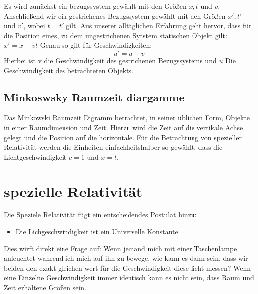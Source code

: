 \documentclass[12pt]{article}
\begin{document}
Es wird zunächst ein bezugssystem gewählt mit den Größen $x, t$ und $v$.
Anschließend wir ein gestrichenes Bezugssystem gewählt mit den Größen $x', t'$ und $v'$, wobei $t = t'$ gilt.
Aus unserer alltäglichen Erfahrung geht hervor, dass für die Position eines, zu dem ungestrichenen Sytstem statischen Objekt gilt: $x' = x-vt$
Genau so gilt für Geschwindigkeiten:
\begin{equation}
\label{vnewton}
u' =u - v
\end{equation}
Hierbei ist v die Geschwindigkeit des gestrichenen Bezugssystems und $u$ Die Geschwindigkeit des betrachteten Objekts.
\subsection{Minkoswsky Raumzeit diargamme}
Das Minkowski Raumzeit Digramm betrachtet, in seiner üblichen Form, Objekte in einer Raumdimension und Zeit.
Hierzu wird die Zeit auf die vertikale Achse gelegt und die Position auf die horizontale.
Für die Betrachtung von spezieller Relativität werden die Einheiten einfachheitshalber so gewählt, dass die Lichtgeschwindigkeit $c = 1$ und $x = t$.
\section{spezielle Relativität}
Die Speziele Relativität fügt ein entscheidendes Postulat hinzu:
\begin{itemize}
\item Die Lichgeschwindigkeit ist ein Universelle Konstante
\end{itemize}
Dies wirft direkt eine Frage auf:
Wenn jemand mich mit einer Taschenlampe anleuchtet wahrend ich mich auf ihn zu bewege, wie kann es dann sein, dass wir beiden den exakt gleichen wert für die Geschwindigkeit diese licht messen?
Wenn eine Einzelne Geschwindigkeit immer identisch kann es nicht sein, dass Raum und Zeit erhaltene Größen sein.
\end{document}
